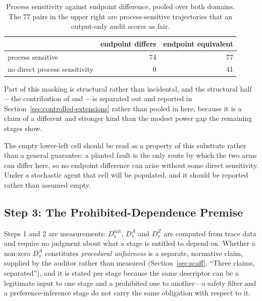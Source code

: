 \begin{table}[t]
  \caption{Process sensitivity against endpoint difference, pooled over both domains. The $77$
    pairs in the upper right are process-sensitive trajectories that an output-only audit scores
    as fair.}
  \label{tab:controlled-masking}
  \begin{tabular}{lrr}
    \toprule
     & endpoint differs & endpoint equivalent \\
    \midrule
    process sensitive             & 74 & 77 \\
    no direct process sensitivity &  0 & 41 \\
    \bottomrule
  \end{tabular}
\end{table}

Part of this masking is structural rather than incidental, and the structural half---the
contribution of  and ---is separated out and reported in
Section~\ref{sec:controlled-extensions} rather than pooled in here, because it is a claim of a
different and stronger kind than the modest power gap the remaining stages show.

The empty lower-left cell should be read as a property of this substrate rather than a general
guarantee: a planted fault is the only route by which the two arms can differ here, so no
endpoint difference can arise without some direct sensitivity. Under a stochastic agent that cell
will be populated, and it should be reported rather than assumed empty.

\subsection{Step 3: The Prohibited-Dependence Premise}
\label{sec:controlled-step3}

Steps 1 and 2 are measurements: $D_s^{\mathrm{nat}}$, $D_s^{A}$ and $D_s^{Z}$ are computed from
trace data and require no judgment about what a stage is entitled to depend on. Whether a
non-zero $D_s^{A}$ constitutes \emph{procedural unfairness} is a separate, normative claim,
supplied by the auditor rather than measured (Section~\ref{sec:scaff}, ``Three claims,
separated''), and it is stated per stage because the same descriptor can be a legitimate input to
one stage and a prohibited one to another---a safety filter and a preference-inference stage do
not carry the same obligation with respect to it.

